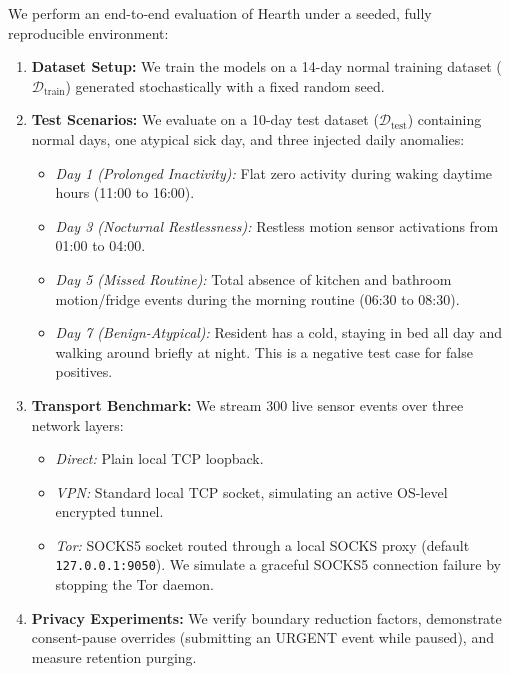 \documentclass[conference]{IEEEtran}
\begin{document}
We perform an end-to-end evaluation of Hearth under a seeded, fully reproducible environment:
\begin{enumerate}
  \item \textbf{Dataset Setup:} We train the models on a 14-day normal training dataset ($\mathcal{D}_{\text{train}}$) generated stochastically with a fixed random seed.
  \item \textbf{Test Scenarios:} We evaluate on a 10-day test dataset ($\mathcal{D}_{\text{test}}$) containing normal days, one atypical sick day, and three injected daily anomalies:
  \begin{itemize}
    \item \textit{Day 1 (Prolonged Inactivity):} Flat zero activity during waking daytime hours (11:00 to 16:00).
    \item \textit{Day 3 (Nocturnal Restlessness):} Restless motion sensor activations from 01:00 to 04:00.
    \item \textit{Day 5 (Missed Routine):} Total absence of kitchen and bathroom motion/fridge events during the morning routine (06:30 to 08:30).
    \item \textit{Day 7 (Benign-Atypical):} Resident has a cold, staying in bed all day and walking around briefly at night. This is a negative test case for false positives.
  \end{itemize}
  \item \textbf{Transport Benchmark:} We stream 300 live sensor events over three network layers:
  \begin{itemize}
    \item \textit{Direct:} Plain local TCP loopback.
    \item \textit{VPN:} Standard local TCP socket, simulating an active OS-level encrypted tunnel.
    \item \textit{Tor:} SOCKS5 socket routed through a local SOCKS proxy (default \texttt{127.0.0.1:9050}). We simulate a graceful SOCKS5 connection failure by stopping the Tor daemon.
  \end{itemize}
  \item \textbf{Privacy Experiments:} We verify boundary reduction factors, demonstrate consent-pause overrides (submitting an URGENT event while paused), and measure retention purging.
\end{enumerate}
\end{document}
